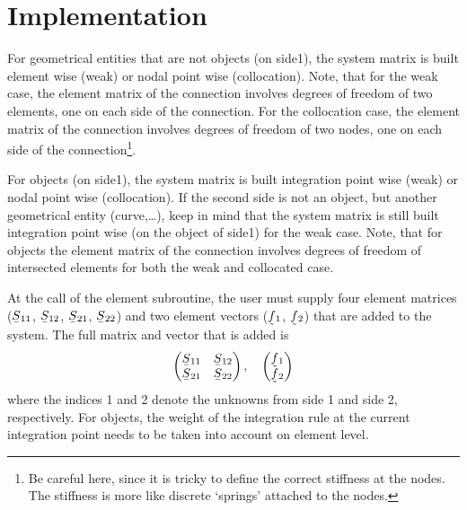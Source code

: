 \section{Implementation}

\label{sec:connimpl}

For geometrical entities that are not objects (on side1), the system
matrix is built element wise (weak) or
nodal point wise (collocation). 
Note, that for the weak case, the element matrix of the connection
involves degrees of freedom of two elements, one on each
side of the connection. For the collocation case,
the element matrix of the connection
involves degrees of freedom of two nodes, one on each 
side of the connection\footnote{Be careful here, since
it is tricky to define the correct stiffness at the nodes. The
stiffness is more like discrete `springs' attached to the nodes.}.

For objects (on side1), the system matrix is built integration
point wise (weak) or
nodal point wise (collocation).
If the second side is not an object, but another
geometrical entity (curve,\ldots), keep in mind that
the system matrix is still built
integration point wise (on the object of side1) for the weak case. 
Note, that for objects
the element matrix of the connection
involves degrees of freedom of intersected elements 
for both the weak and collocated case.

At the call of the element subroutine, the user must supply
four element matrices ($\mat S_{11}$, $\mat S_{12}$, $\mat S_{21}$, 
$\mat S_{22}$) and two element vectors ($\col f_1$, $\col f_2$) that are
added to the system. The full matrix and vector that is added is
\[
 \begin{pmatrix}
    \mat S_{11} & \mat S_{12} \\
    \mat S_{21} & \mat S_{22}
 \end{pmatrix},
\quad
 \begin{pmatrix}
    \col f_{1}  \\
    \col f_{2} 
 \end{pmatrix}
\]
where the indices 1 and 2 denote the unknowns 
from side 1 and side 2, respectively. For objects, the weight of the
integration rule at the current integration point
needs to be taken into account on element level.

